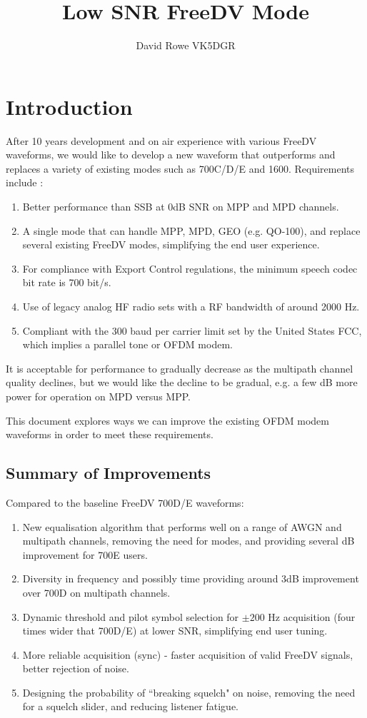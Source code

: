 \documentclass{article}
\begin{document}
\title{Low SNR FreeDV Mode}
\author{David Rowe VK5DGR}
\maketitle

\section{Introduction}

After 10 years development and on air experience with various FreeDV waveforms, we would like to develop a new waveform that outperforms and replaces a variety of existing modes such as 700C/D/E and 1600.  Requirements include \cite{freedv-020}:
\begin{enumerate}
\item Better performance than SSB at 0dB SNR on MPP and MPD channels.
\item A single mode that can handle MPP, MPD, GEO (e.g. QO-100), and replace several existing FreeDV modes, simplifying the end user experience.
\item For compliance with Export Control regulations, the minimum speech codec bit rate is 700 bit/s.
\item Use of legacy analog HF radio sets with a RF bandwidth of around 2000 Hz.
\item Compliant with the 300 baud per carrier limit set by the United States FCC, which implies a parallel tone or OFDM modem. 
\end{enumerate}
It is acceptable for performance to gradually decrease as the multipath channel quality declines, but we would like the decline to be gradual, e.g. a few dB more power for operation on MPD versus MPP.

This document explores ways we can improve the existing OFDM modem waveforms in order to meet these requirements.

\subsection{Summary of Improvements}

Compared to the baseline FreeDV 700D/E waveforms:
\begin{enumerate}
\item New equalisation algorithm that performs well on a range of AWGN and multipath channels, removing the need for modes, and providing several dB improvement for 700E users.
\item Diversity in frequency and possibly time providing around 3dB improvement over 700D on multipath channels.  
\item Dynamic threshold and pilot symbol selection for $\pm 200$ Hz acquisition (four times wider that 700D/E) at lower SNR, simplifying end user tuning.
\item More reliable acquisition (sync) - faster acquisition of valid FreeDV signals, better rejection of noise.
\item Designing the probability of ``breaking squelch" on noise, removing the need for a squelch slider, and reducing listener fatigue.
\end{enumerate}
\end{document}
